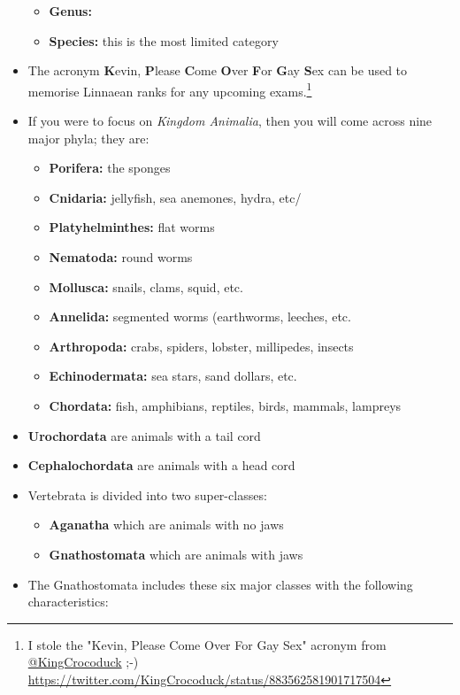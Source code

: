\documentclass[10pt, landscape]{article}
\begin{document}
\begin{multicols}{2}
\begin{itemize}
\begin{itemize}
					\item \textbf{Genus:}
					\item \textbf{Species:} this is the most limited category
				\end{itemize}
				\item The acronym \textbf{K}evin, \textbf{P}lease \textbf{C}ome \textbf{O}ver \textbf{F}or \textbf{G}ay \textbf{S}ex can be used to memorise Linnaean ranks for any upcoming exams.\footnote{I stole the "Kevin, Please Come Over For Gay Sex" acronym from \href{https://twitter.com/KingCrocoduck}{@KingCrocoduck} ;-) \\ \href{https://twitter.com/KingCrocoduck/status/883562581901717504}{https://twitter.com/KingCrocoduck/status/883562581901717504}}
				\item If you were to focus on \textit{Kingdom Animalia}, then you will come across nine major phyla; they are:
				\begin{itemize}
					\item \textbf{Porifera:} the sponges
					\item \textbf{Cnidaria:} jellyfish, sea anemones, hydra, etc/
					\item \textbf{Platyhelminthes:} flat worms
					\item \textbf{Nematoda:} round worms
					\item \textbf{Mollusca:} snails, clams, squid, etc.
					\item \textbf{Annelida:} segmented worms (earthworms, leeches, etc.
					\item \textbf{Arthropoda:} crabs, spiders, lobster, millipedes, insects
					\item \textbf{Echinodermata:} sea stars, sand dollars, etc.
					\item \textbf{Chordata:} fish, amphibians, reptiles, birds, mammals, lampreys
				\end{itemize}
				\item \textbf{Urochordata} are animals with a tail cord
				\item \textbf{Cephalochordata} are animals with a head cord
				\item Vertebrata is divided into two super-classes:
				\begin{itemize}
					\item \textbf{Aganatha} which are animals with no jaws
					\item \textbf{Gnathostomata} which are animals with jaws
				\end{itemize}
				\item The Gnathostomata includes these six major classes with the following characteristics:

\end{itemize}
\end{multicols}
\end{document}
